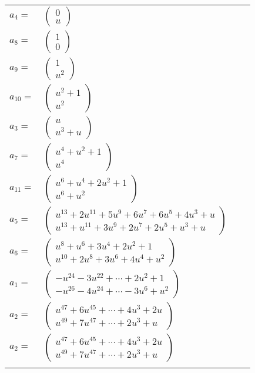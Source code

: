\documentclass[1p]{elsarticle_modified}
\theoremstyle{definition}
\begin{document}
\begin{tabular}{m{7pt} m{180pt} m{7pt} m{180pt} }
\flushright $a_{4}=$&$\begin{pmatrix}0\\u\end{pmatrix}$ \\
\flushright $a_{8}=$&$\begin{pmatrix}1\\0\end{pmatrix}$ \\
\flushright $a_{9}=$&$\begin{pmatrix}1\\u^2\end{pmatrix}$ \\
\flushright $a_{10}=$&$\begin{pmatrix}u^2+1\\u^2\end{pmatrix}$ \\
\flushright $a_{3}=$&$\begin{pmatrix}u\\u^3+u\end{pmatrix}$ \\
\flushright $a_{7}=$&$\begin{pmatrix}u^4+u^2+1\\u^4\end{pmatrix}$ \\
\flushright $a_{11}=$&$\begin{pmatrix}u^6+u^4+2 u^2+1\\u^6+u^2\end{pmatrix}$ \\
\flushright $a_{5}=$&$\begin{pmatrix}u^{13}+2 u^{11}+5 u^9+6 u^7+6 u^5+4 u^3+u\\u^{13}+u^{11}+3 u^9+2 u^7+2 u^5+u^3+u\end{pmatrix}$ \\
\flushright $a_{6}=$&$\begin{pmatrix}u^8+u^6+3 u^4+2 u^2+1\\u^{10}+2 u^8+3 u^6+4 u^4+u^2\end{pmatrix}$ \\
\flushright $a_{1}=$&$\begin{pmatrix}- u^{24}-3 u^{22}+\cdots+2 u^2+1\\- u^{26}-4 u^{24}+\cdots-3 u^6+u^2\end{pmatrix}$ \\
\flushright $a_{2}=$&$\begin{pmatrix}u^{47}+6 u^{45}+\cdots+4 u^3+2 u\\u^{49}+7 u^{47}+\cdots+2 u^3+u\end{pmatrix}$\\ \flushright $a_{2}=$&$\begin{pmatrix}u^{47}+6 u^{45}+\cdots+4 u^3+2 u\\u^{49}+7 u^{47}+\cdots+2 u^3+u\end{pmatrix}$\\&\end{tabular}
\end{document}
